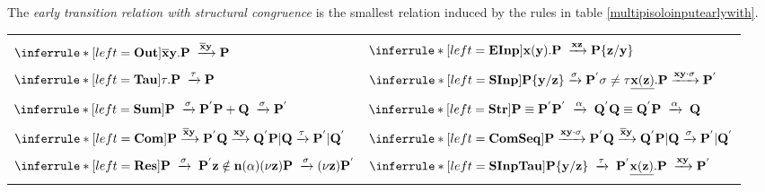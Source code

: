 \begin{definition}
  The \emph{early transition relation with structural congruence} is the smallest relation induced by the rules in table \ref{multipisoloinputearlywith}.
  \begin{table}
    \begin{tabular}{ll}
	  \hline\\
	  $\inferrule* [left=\bf{Out}]{
	  }{
	    \overline{x}y.P \;\xrightarrow{\overline{x}y} P
	  }$
	&
	  $\inferrule* [left=\bf{EInp}]{
	  }{
	    x(y).P \;\xrightarrow{xz} P\{z/y\}
	  }$
      \\\\
	  $\inferrule* [left=\bf{Tau}]{
	  }{
	    \tau.P \;\xrightarrow{\tau} P
	  }$
	&
	  $\inferrule* [left=\bf{SInp}]{
	      P\{y/z\} \xrightarrow{\sigma} P^{'}
	    \\
	      \sigma\neq \tau
	  }{
	    \underline{x(z)}.P \xrightarrow{xy \cdot \sigma} P^{'}
	  }$
      \\\\
	  $\inferrule* [left=\bf{Sum}]{
	    P \;\xrightarrow{\sigma} P^{'}
	  }{
	    P+Q \;\xrightarrow{\sigma} P^{'}
	  }$
	&
	  $\inferrule* [left=\bf{Str}]{
	      P\equiv P^{'}
	    \\
	      P^{'}\; \xrightarrow{\alpha}\; Q^{'}
	    \\
	      Q\equiv Q^{'}
	  }{
	      P\; \xrightarrow{\alpha}\; Q
	  }$
      \\\\
	  $\inferrule* [left=\bf{Com}]{
	      P \xrightarrow{\overline{x}y} P^{'}
	    \\
	      Q \xrightarrow{xy} Q^{'}
	  }{
	    P|Q \xrightarrow{\tau} P^{'}|Q^{'}
	  }$
	&
	  $\inferrule* [left=\bf{ComSeq}]{
	      P \xrightarrow{xy\cdot \sigma} P^{'}
	    \\
	      Q \xrightarrow{\overline{x}y} Q^{'}
	  }{
	    P|Q \xrightarrow{\sigma} P^{'}|Q^{'}
	  }$
      \\\\
	  $\inferrule* [left=\bf{Res}]{
	      P\; \xrightarrow{\sigma}\; P^{'}
	    \\
	      z\notin n(\alpha)
	  }{
	    (\nu z) P \;\xrightarrow{\sigma} (\nu z) P^{'}
	  }$
	&
	  $\inferrule* [left=\bf{SInpTau}]{
	      P\{y/z\}\; \xrightarrow{\tau}\; P^{'}
	  }{
	    \underline{x(z)}.P \;\xrightarrow{xy} P^{'}
	  }$
      \\\\

\end{tabular}
\end{table}
\end{definition}

